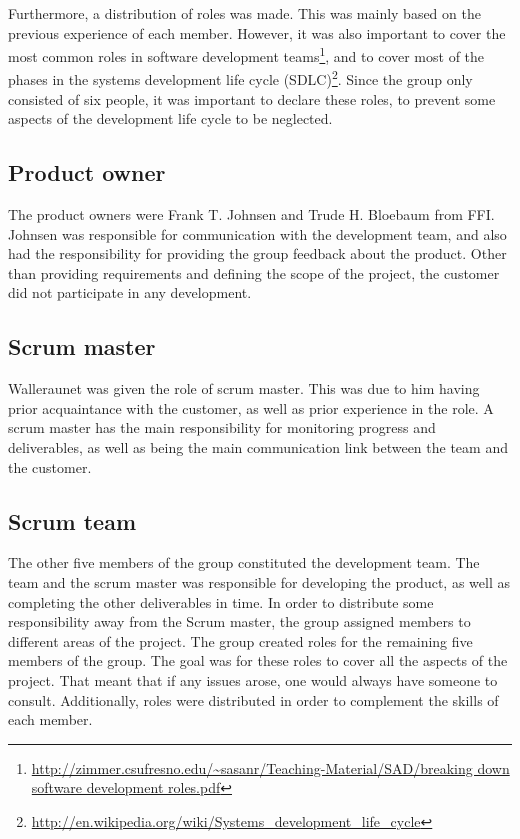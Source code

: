 Furthermore, a distribution of roles was made. This was mainly based on the previous experience of each member. However, it was also important to cover the most common roles in software development teams\footnote{\url{http://zimmer.csufresno.edu/~sasanr/Teaching-Material/SAD/breaking down software development roles.pdf}}, and to cover most of the phases in the systems development life cycle (SDLC)\footnote{\url{http://en.wikipedia.org/wiki/Systems_development_life_cycle}}. Since the group only consisted of six people, it was important to declare these roles, to prevent some aspects of the development life cycle to be neglected.

\subsection{Product owner}

The product owners were Frank T. Johnsen and Trude H. Bloebaum from FFI. Johnsen was responsible for communication with the development team, and also had the responsibility for providing the group feedback about the product. Other than providing requirements and defining the scope of the project, the customer did not participate in any development.

\subsection{Scrum master}

Walleraunet was given the role of scrum master. This was due to him having prior acquaintance with the customer, as well as prior experience in the role. A scrum master has the main responsibility for monitoring progress and deliverables, as well as being the main communication link between the team and the customer.

\subsection{Scrum team}

The other five members of the group constituted  the development team. The team and the scrum master was responsible for developing the product, as well as completing the other deliverables in time. In order to distribute some responsibility away from the Scrum master, the group assigned members to different areas of the project. The group created roles for the remaining five members of the group. The goal was for these roles to cover all the aspects of the project. That meant that if any issues arose, one would always have someone to consult. Additionally, roles were distributed in order to complement the skills of each member.

